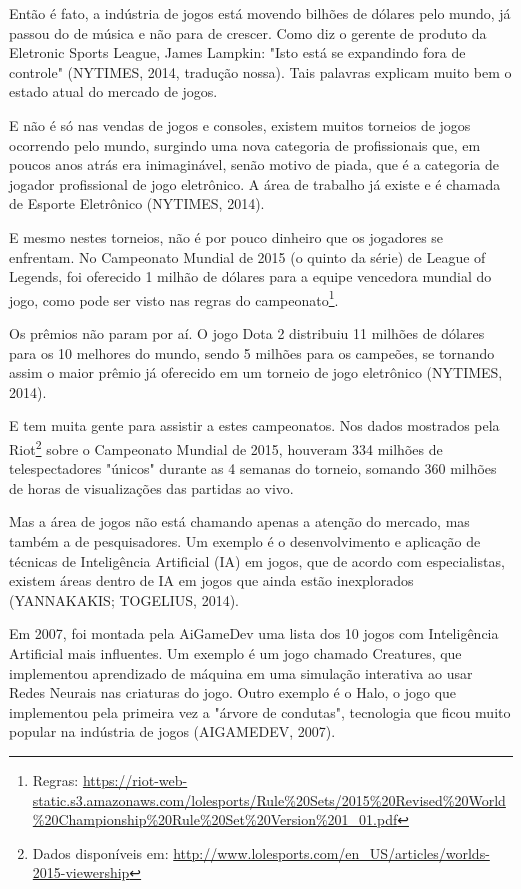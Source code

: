 \documentclass[12pt,a4paper]{article}
\begin{document}
	Então é fato, a indústria de jogos está movendo bilhões de dólares pelo mundo,
	já passou do de música e não para de crescer.
	Como diz o gerente de produto da Eletronic Sports League, James Lampkin:
	"Isto está se expandindo fora de controle"{}
	(NYTIMES, 2014, tradução nossa).
	Tais palavras explicam muito bem o estado atual do mercado de jogos.
	
	E não é só nas vendas de jogos e consoles,
	existem muitos torneios de jogos ocorrendo pelo mundo,
	surgindo uma nova categoria de profissionais que,
	em poucos anos atrás era inimaginável, senão motivo de piada,
	que é a categoria de jogador profissional de jogo eletrônico.
	A área de trabalho já existe e é chamada de Esporte Eletrônico (NYTIMES, 2014).
	
	E mesmo nestes torneios, não é por pouco dinheiro que os jogadores se enfrentam.
	No Campeonato Mundial de 2015 (o quinto da série) de League of Legends,
	foi oferecido 1 milhão de dólares para a equipe vencedora mundial do jogo,
	como pode ser visto nas regras do campeonato\footnote{Regras: \url{https://riot-web-static.s3.amazonaws.com/lolesports/Rule\%20Sets/2015\%20Revised\%20World\%20Championship\%20Rule\%20Set\%20Version\%201\_01.pdf}}.
	
	Os prêmios não param por aí.
	O jogo Dota 2 distribuiu 11 milhões de dólares para os 10 melhores do mundo,
	sendo 5 milhões para os campeões,
	se tornando assim o maior prêmio já oferecido em um torneio de jogo eletrônico (NYTIMES, 2014).
	
	E tem muita gente para assistir a estes campeonatos.
	Nos dados mostrados pela Riot\footnote{Dados disponíveis em: \url{http://www.lolesports.com/en_US/articles/worlds-2015-viewership}}
	sobre o Campeonato Mundial de 2015,
	houveram 334 milhões de telespectadores "únicos"{} durante as 4 semanas do torneio,
	somando 360 milhões de horas de visualizações das partidas ao vivo.
	
	Mas a área de jogos não está chamando apenas a atenção do mercado,
	mas também a de pesquisadores.
	Um exemplo é o desenvolvimento e aplicação de técnicas de Inteligência Artificial (IA) em jogos,
	que de acordo com especialistas,
	existem áreas dentro de IA em jogos que ainda estão inexplorados (YANNAKAKIS; TOGELIUS, 2014).
	
	Em 2007, foi montada pela AiGameDev uma lista dos 10 jogos com Inteligência Artificial mais influentes.
	Um exemplo é um jogo chamado Creatures,
	que implementou aprendizado de máquina em uma simulação interativa
	ao usar Redes Neurais nas criaturas do jogo.
	Outro exemplo é o Halo,
	o jogo que implementou pela primeira vez a "árvore de condutas",
	tecnologia que ficou muito popular na indústria de jogos (AIGAMEDEV, 2007).
	
\end{document}
